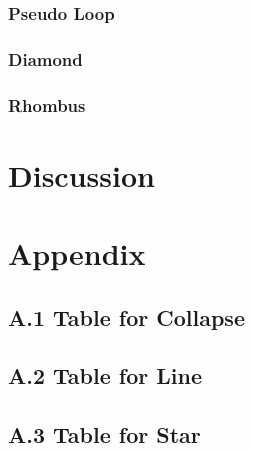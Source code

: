 \documentclass[12pt,a4paper,oneside]{book}
\theoremstyle{plain}
\theoremstyle{definition}
\theoremstyle{remark}
\theoremstyle{definition}
\numberwithin{equation}{chapter}
\begin{document}
\newpage{}

\subsection{Pseudo Loop}


\newpage{}

\subsection{Diamond}


\newpage{}

\subsection{Rhombus}






\chapter{Discussion}



\newpage{} %

\chapter*{Appendix}
\section*{A.1 Table for Collapse}


\newpage{}

\section*{A.2 Table for Line}


\newpage{}

\section*{A.3 Table for Star}

\end{document}
